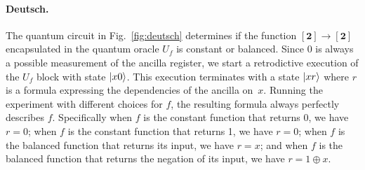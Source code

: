 \documentclass{article}
\newcommand{\finset}[1]{[\mathbf{#1}]}
\begin{document}
\paragraph*{Deutsch.} The quantum circuit in Fig.~\ref{fig:deutsch} determines
if the function $\finset{2} \rightarrow \finset{2}$ encapsulated in
the quantum oracle $U_f$ is constant or balanced. Since 0 is always a
possible measurement of the ancilla register, we start a retrodictive
execution of the $U_f$ block with state $\ket{x0}$. This execution
terminates with a state $\ket{xr}$ where $r$ is a formula expressing
the dependencies of the ancilla on~$x$. Running the experiment with
different choices for $f$, the resulting formula always perfectly
describes $f$. Specifically when $f$ is the constant function that
returns 0, we have $r=0$; when $f$ is the constant function that
returns 1, we have $r=0$; when $f$ is the balanced function that
returns its input, we have $r=x$; and when $f$ is the balanced function that
returns the negation of its input, we have $r=1\oplus x$.
\end{document}
